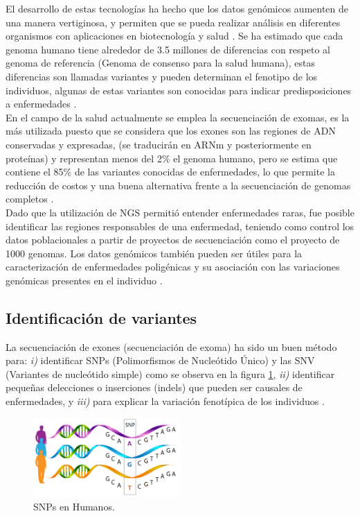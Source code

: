 El desarrollo de estas tecnologías ha hecho que los datos genómicos aumenten de una manera vertiginosa, y permiten que se pueda realizar análisis en diferentes organismos con aplicaciones en biotecnología y salud \cite{Herraez2012}. Se ha estimado que cada genoma humano tiene alrededor de 3.5 millones de diferencias con respeto al genoma de referencia (Genoma de consenso para la salud humana), estas diferencias son llamadas variantes y pueden determinan el fenotipo de los individuos, algunas de estas variantes son conocidas para indicar predisposiciones a enfermedades \cite{Kutzera2017}.\\

En el campo de la salud actualmente se emplea la secuenciación de exomas, es la más utilizada puesto que se considera que los exones son las regiones de ADN conservadas y expresadas, (se traducirán en ARNm y posteriormente en proteínas) y representan menos del 2\% el genoma humano, pero se estima que contiene el 85\% de las variantes conocidas de enfermedades, lo que permite la reducción de costos y una buena alternativa frente a la secuenciación de genomas completos \cite{Illumina2017,Klug2013,Herraez2012}.\\

Dado que la utilización de NGS permitió entender enfermedades raras, fue posible identificar las regiones responsables de una enfermedad, teniendo como control los datos poblacionales a partir de proyectos de secuenciación como el proyecto de 1000 genomas. Los datos genómicos también pueden ser útiles para la caracterización de enfermedades poligénicas y su asociación con las variaciones genómicas presentes en el individuo \cite{Poliakov2015}. 

\subsection{Identificación de variantes}

La secuenciación de exones (secuenciación de exoma) ha sido un buen método para: \textit{i)} identificar SNPs (Polimorfismos de Nucleótido Único) y las SNV (Variantes de nucleótido simple) como se observa en la figura \ref{fig:snp}, \textit{ii)} identificar pequeñas delecciones o inserciones (indels) que pueden  ser  causales de enfermedades, y \textit{iii)} para explicar la variación fenotípica de los individuos \cite{Deng2011,Wenger2017}.\\

\begin{figure}[h!] 
	\centering
	\includegraphics[width=0.5\textwidth]{Estado/snp}
	\caption{SNPs en Humanos.} \label{fig:snp}
\end{figure}

